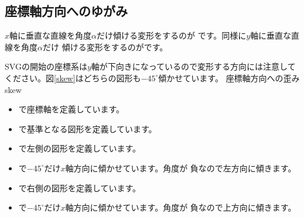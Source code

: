 \subsection{座標軸方向へのゆがみ}
$x$軸に垂直な直線を角度$\alpha$だけ傾ける変形をするのが
です。同様に$y$軸に垂直な直線を角度$\alpha$だけ
傾ける変形をするのがです。

SVGの開始の座標系は$y$軸が下向きになっているので変形する方向には注意して
ください。図\ref{skew}はどちらの図形も$-45^{\circ}$傾かせています。
         {座標軸方向への歪み}{skew}

\begin{itemize}
 \item {}で座標軸を定義しています。
 \item {}で基準となる図形を定義しています。
 \item {}で左側の図形を定義しています。
 \item {}で$-45^{\circ}$だけ$x$軸方向に傾かせています。角度が
       負なので左方向に傾きます。
 \item {}で右側の図形を定義しています。
 \item {}で$-45^{\circ}$だけ$x$軸方向に傾かせています。角度が
       負なので上方向に傾きます。
\end{itemize}
